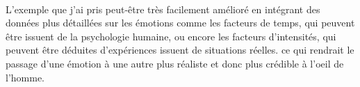 ~\par
L’exemple que j’ai pris peut-être très facilement amélioré en intégrant des données plus détaillées sur les émotions comme les  facteurs de temps, qui peuvent être issuent de la psychologie humaine, ou encore les facteurs d'intensités, qui peuvent être déduites d'expériences issuent de situations réelles. ce qui rendrait le passage d’une émotion à une autre plus réaliste et donc plus crédible à l’oeil de l’homme.
